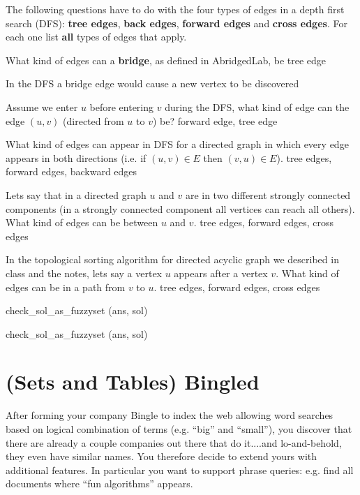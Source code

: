 \begin{problem}
%

The following questions have to do with the four types of edges in
a depth first search (DFS): \textbf{tree edges}, \textbf{back edges},
\textbf{forward edges} and \textbf{cross edges}.  For each one list
\textbf{all} types of edges that apply.


\ask[3.]
What kind of edges can a \textbf{bridge}, as defined in AbridgedLab, be
\sol
tree edge

\hint[0.7]
In the DFS a bridge edge would cause a new vertex to be discovered

\ask[3.]
Assume we enter $u$ before entering $v$ during the DFS, what kind of
edge can the edge $(u,v)$ (directed from $u$ to $v$) be?
\sol
forward edge, tree edge


\ask[3.]
What kind of edges can appear in DFS for a directed graph in which
every edge appears in both directions (i.e. if $(u,v) \in E$ then $(v,u)
\in E$).
\sol
tree edges, forward edges, backward edges


\ask[3.] Lets say that in a directed graph $u$ and $v$ are in two
different strongly connected components (in a strongly connected
component all vertices can reach all others).  What kind of edges can
be between $u$ and $v$.
\sol
tree edges, forward edges, cross edges

\ask[3.]
In the topological sorting algorithm for directed acyclic graph we
described in class and the notes, lets say a vertex $u$ appears
after a vertex $v$.  What kind of edges can be in a path
from $v$ to $u$.
\sol
tree edges, forward edges, cross edges

\algo
\algoc
check_sol_as_fuzzyset (ans, sol)

\algog
check_sol_as_fuzzyset (ans, sol)

\end{problem}



\section{(Sets and Tables) Bingled}


%

After forming your company Bingle to index the web allowing word
searches based on logical combination of terms (e.g. ``big'' and
``small''), you discover that there are already a couple companies out
there that do it....and lo-and-behold, they even have similar names.
You therefore decide to extend yours with additional features.  In
particular you want to support phrase queries: e.g. find all
documents where ``fun algorithms'' appears.


